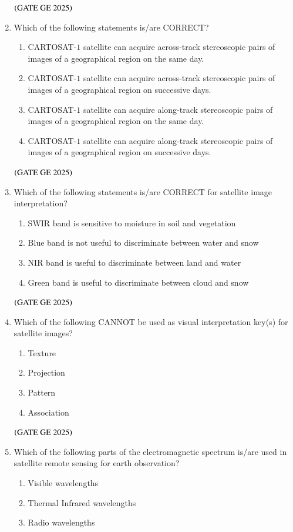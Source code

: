 \documentclass[journal,12pt,onecolumn]{IEEEtran}
\theoremstyle{remark}
\begin{document}
\begin{enumerate}
\hfill $\left(\text{GATE GE 2025}\right)$
\bigskip
\item Which of the following statements is/are CORRECT?
\begin{enumerate}
\item CARTOSAT-$1$ satellite can acquire across-track stereoscopic pairs of images of a geographical region on the same day.
\item CARTOSAT-$1$ satellite can acquire across-track stereoscopic pairs of images of a geographical region on successive days.
\item CARTOSAT-$1$ satellite can acquire along-track stereoscopic pairs of images of a geographical region on the same day.
\item CARTOSAT-$1$ satellite can acquire along-track stereoscopic pairs of images of a geographical region on successive days.
\end{enumerate}
\hfill $\left(\text{GATE GE 2025}\right)$
\bigskip
\item Which of the following statements is/are CORRECT for satellite image interpretation?
\begin{enumerate}
\item SWIR band is sensitive to moisture in soil and vegetation
\item Blue band is not useful to discriminate between water and snow
\item NIR band is useful to discriminate between land and water
\item Green band is useful to discriminate between cloud and snow
\end{enumerate}
\hfill $\left(\text{GATE GE 2025}\right)$
\bigskip
\item Which of the following CANNOT be used as visual interpretation key(s) for satellite images?
\begin{enumerate}
\item Texture
\item Projection
\item Pattern
\item Association
\end{enumerate}
\hfill $\left(\text{GATE GE 2025}\right)$
\bigskip
\item Which of the following parts of the electromagnetic spectrum is/are used in satellite remote sensing for earth observation?
\begin{enumerate}
\item Visible wavelengths
\item Thermal Infrared wavelengths
\item Radio wavelengths

\end{enumerate}
\end{enumerate}
\end{document}
